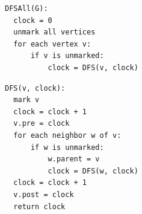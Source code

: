 \documentclass[11pt]{article}
\begin{document}
\begin{enumerate}
\noindent
\begin{minipage}[t]{0.45\textwidth}
\vspace{0pt}
\small
\begin{verbatim}
DFSAll(G):
  clock = 0
  unmark all vertices
  for each vertex v:
      if v is unmarked:
          clock = DFS(v, clock)
\end{verbatim}
\end{minipage}\hfill
\begin{minipage}[t]{0.45\textwidth}
\vspace{0pt}
\small
\begin{verbatim}
DFS(v, clock):
  mark v
  clock = clock + 1
  v.pre = clock
  for each neighbor w of v:
      if w is unmarked:
          w.parent = v
          clock = DFS(w, clock)
  clock = clock + 1
  v.post = clock
  return clock
\end{verbatim}
\end{minipage}


\end{enumerate}
\end{document}
